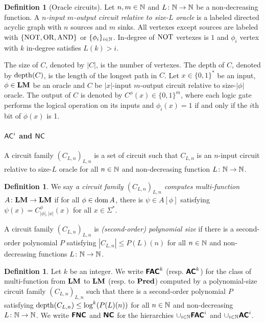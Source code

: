 \documentclass{article}
\theoremstyle{definition}
\newtheorem{definition}[theorem]{Definition}
\theoremstyle{remark}
\begin{document}
\begin{definition}[Oracle circuits]
Let $n, m \in \mathbb N$ and $L \colon \mathbb N \to \mathbb N$ be a non-decreasing function.
A \emph{$n$-input $m$-output circuit relative to size-$L$ oracle} is 
a labeled directed acyclic graph with $n$ sources and $m$ sinks.
All vertexes except sources are labeled with $\{\mathrm{NOT}, \mathrm{OR}, \mathrm{AND}\}$
or $\{\phi_i\}_{i \in \mathbb N}$.
In-degree of $\mathrm{NOT}$ vertexes is $1$ and
$\phi_i$ vertex with $k$ in-degree satisfies $L(k) > i$.


The size of $C$, denoted by $|C|$, is the number of vertexes.
The depth of $C$, denoted by $\mathop{\rm depth}(C)$, is the length of the longest path in $C$.
Let $x \in \{0, 1\}^*$ be an input, $\phi \in \mathbf{LM}$ be an oracle and
$C$ be $|x|$-input $m$-output circuit relative to size-$|\phi|$ oracle.
The output of $C$ is denoted by $C^\phi(x) \in \{0, 1\}^m$,
where each logic gate performs the logical operation on its inputs
and $\phi_i(x) = 1$ if and only if the $i$th bit of $\phi(x)$ is 1.
\end{definition}



\paragraph{\texorpdfstring{$\mathsf{AC}^i$ and $\mathsf{NC}$}{ACi and NCi}}

A circuit family $(C_{L,n})_{L,n}$ is a set of circuit
such that $C_{L, n}$ is an $n$-input circuit relative to size-$L$ oracle
for all $n \in \mathbb N$ and non-decreasing function $L \colon \mathbb N \to \mathbb N$.

\begin{definition}
 We say \emph{a circuit family $(C_{L,n})_{L,n}$ computes multi-function 
 $A \colon \mathbf{LM} \to \mathbf{LM}$} if for all $\phi \in \mathop{\rm dom} A$, 
 there is $\psi \in A[\phi]$ satisfying $\psi(x) = C_{|\phi|, |x|}^\phi(x)$
 for all $x \in \Sigma^*$.
\end{definition}

A circuit family $(C_{L,n})_{L,n}$ is \emph{(second-order) polynomial size}
if there is a second-order polynomial $P$ satisfying
$|C_{L,n}| \le P(L)(n)$ for all $n \in \mathbb N$ and non-decreasing functions
$L \colon \mathbb N \to \mathbb N$.

\begin{definition}
 Let $k$ be an integer.
 We write $\text{\bfseries \sffamily \upshape FAC}^k$ (resp. $\text{\bfseries \sffamily \upshape AC}^k$) for the class of 
 multi-function from $\mathbf{LM}$ to $\mathbf{LM}$ (resp. to $\mathbf{Pred}$) computed by
 a polynomial-size circuit family $(C_{L,n})_{L,n}$ such that
 there is a second-order polynomial $P$ satisfying
 $\mathop{\rm depth}(C_{L,n}) \le \log^k(P(L)(n))$ for all $n \in \mathbb N$ and non-decreasing
 $L \colon \mathbb N \to \mathbb N$.
 We write $\text{\bfseries \sffamily \upshape FNC}$ and $\text{\bfseries \sffamily \upshape NC}$ for the hierarchies
 $\cup_{i \in \mathbb N} \text{\bfseries \sffamily \upshape FAC}^i$ and $\cup_{i \in \mathbb N} \text{\bfseries \sffamily \upshape AC}^i$.
\end{definition}
\end{document}
